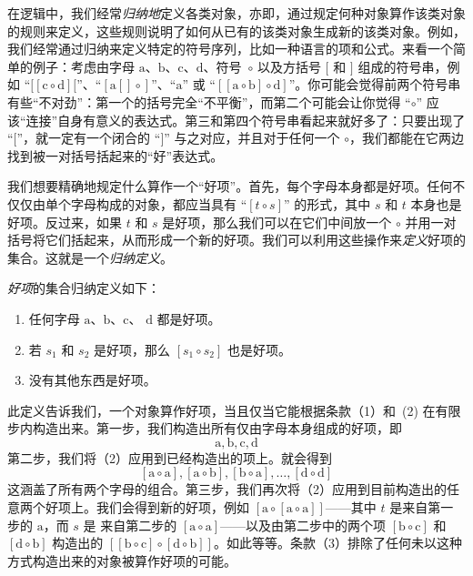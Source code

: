 \documentclass[../../../include/open-logic-section]{subfiles}
\begin{document}


在逻辑中，我们经常\emph{归纳地}定义各类对象，亦即，通过规定何种对象算作该类对象的规则来定义，这些规则说明了如何从已有的该类对象生成新的该类对象。例如，我们经常通过归纳来定义特定的符号序列，比如一种语言的项和公式。来看一个简单的例子：考虑由字母 $\mathrm{a}$、$\mathrm{b}$、$\mathrm{c}$、$\mathrm{d}$、符号~$\circ$ 以及方括号 $[$ 和 $]$ 组成的符号串，例如 “$[[\mathrm{c} \circ \mathrm{d}][$”、“$[\mathrm{a}[]\circ]$”、“$\mathrm{a}$” 或 “$[[\mathrm{a} \circ \mathrm{b}]\circ
\mathrm{d}]$”。你可能会觉得前两个符号串有些“不对劲”：第一个的括号完全“不平衡”，而第二个可能会让你觉得 “$\circ$” 应该“连接”自身有意义的表达式。第三和第四个符号串看起来就好多了：只要出现了 “$[$”，就一定有一个闭合的 “$]$” 与之对应，并且对于任何一个 $\circ$，我们都能在它两边找到被一对括号括起来的“好”表达式。

我们想要精确地规定什么算作一个“好项”。首先，每个字母本身都是好项。任何不仅仅由单个字母构成的对象，都应当具有 “$[t \circ s]$” 的形式，其中 $s$ 和 $t$ 本身也是好项。反过来，如果 $t$ 和 $s$ 是好项，那么我们可以在它们中间放一个 $\circ$ 并用一对括号将它们括起来，从而形成一个新的好项。我们可以利用这些操作来\emph{定义}好项的集合。这就是一个\emph{归纳定义}。

\begin{defn}[好项]
  \emph{好项}的集合归纳定义如下：
  \begin{enumerate}
  \item 任何字母 $\mathrm{a}$、$\mathrm{b}$、$\mathrm{c}$、
    $\mathrm{d}$ 都是好项。
  \item 若 $s_1$ 和 $s_2$ 是好项，那么 $[s_1 \circ s_2]$ 也是好项。
  \item 没有其他东西是好项。
  \end{enumerate}
\end{defn}

此定义告诉我们，一个对象算作好项，当且仅当它能根据条款（1）和~(2)
在有限步内构造出来。第一步，我们构造出所有仅由字母本身组成的好项，即
\[
\mathrm{a}, \mathrm{b}, \mathrm{c}, \mathrm{d}
\]
第二步，我们将（2）应用到已经构造出的项上。就会得到
\[
[\mathrm{a} \circ \mathrm{a}], [\mathrm{a} \circ \mathrm{b}],
[\mathrm{b} \circ \mathrm{a}], \dots, [\mathrm{d} \circ \mathrm{d}]
\]
这涵盖了所有两个字母的组合。第三步，我们再次将（2）应用到目前构造出的任意两个好项上。我们会得到新的好项，例如 $[\mathrm{a} \circ [\mathrm{a} \circ
    \mathrm{a}]]$——其中 $t$ 是来自第一步的 $\mathrm{a}$，而 $s$ 是
来自第二步的 $[\mathrm{a} \circ \mathrm{a}]$——以及由第二步中的两个项 $[\mathrm{b} \circ \mathrm{c}]$ 和 $[\mathrm{d}
  \circ \mathrm{b}]$ 构造出的 $[[\mathrm{b} \circ
    \mathrm{c}] \circ [\mathrm{d} \circ \mathrm{b}]]$。如此等等。条款（3）排除了任何未以这种方式构造出来的对象被算作好项的可能。
\end{document}
